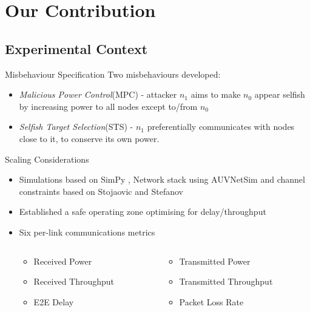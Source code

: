 \documentclass{beamer}
\begin{document}
\section{Our Contribution}

\subsection{Experimental Context}

\begin{frame}{Misbehaviour Specification}
  Two misbehaviours developed:
  \begin{itemize}
    \item \emph{Malicious Power Control}(MPC) - attacker $n_1$ aims to make $n_0$ appear selfish by increasing power to all nodes except to/from $n_0$
    \item \emph{Selfish Target Selection}(STS) - $n_1$ preferentially communicates with nodes close to it, to conserve its own power.
  \end{itemize}

\end{frame}

\begin{frame}{Scaling Considerations}
  \begin{itemize}
    \item Simulations based on SimPy \autocite{Mueller2003SimPy}, Network stack using AUVNetSim \autocite{Miquel2008} and channel constraints based on Stojaovic and Stefanov \autocite{Stojanovic2007,Stefanov2011}\hyperlink{tab:sysconstraints}{}
      \pause
    \item Established a safe operating zone optimising for delay/throughput  \hyperlink{eq:networkeffects}{}
      \pause
    \item Six per-link communications metrics
      \pause\begin{columns}
        \begin{column}{0.5\textwidth}
          \begin{itemize}
            \item Received Power
            \item Received Throughput
            \item E2E Delay
          \end{itemize}
        \end{column}
        \begin{column}{0.5\textwidth}
          \begin{itemize}
            \item Transmitted Power
            \item Transmitted Throughput
            \item Packet Loss Rate
          \end{itemize}
        \end{column}
      \end{columns}
  \end{itemize}

\end{frame}
\end{document}
